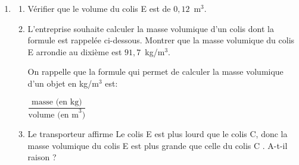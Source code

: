\documentclass[exercice,a4]{thedocument}%
\begin{document}
\begin{enumerate}[resume]
\item
	\begin{enumerate}
		\item Vérifier que le volume du colis E est de $0,12$~m$^3$.
		\item L'entreprise souhaite calculer la masse volumique d'un colis dont la formule est rappelée
ci-dessous. Montrer que la masse volumique du colis E arrondie au dixième est $91,7$~kg/m$^3$.

On rappelle que la formule qui permet de calculer la masse volumique d'un objet en kg/m$^3$ est:

\begin{center} $\dfrac{\text{masse (en kg)}}{\text{volume (en m}^3)}$\end{center}

		\item Le transporteur affirme \og Le colis E est plus lourd que le colis C, donc la masse volumique du colis E est plus grande que celle du colis C \fg. A-t-il raison ?
	\end{enumerate}
\end{enumerate}

\bigskip
\showthesource
\end{document}
